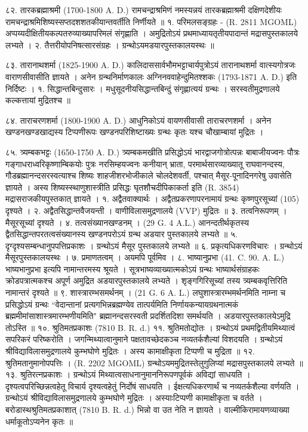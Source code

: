 ८२. तारकब्रह्माश्रमी (1700-1800 A. D.)
रामचन्द्राश्रमिणं नमस्यन्नयं तारकब्रह्माश्रमी दक्षिणदेशीयः रामचन्द्राश्रमिशिष्यस्सप्तदशशतकीयान्तवर्तीति निर्णीयते ॥
१. परिमलसङ्ग्रहः - (R. 2811 MGOML) अप्पय्यदीक्षितीयकल्पतरुव्याख्यापरिमलं संगृह्णाति । अमुद्रितोऽयं प्रथमाध्यायतृतीयपादान्तं मद्रासपुस्तकालये लभ्यते ।
२. तैत्तरीयोपनिषत्सारसंग्रहः । ग्रन्थोऽयमडयारपुस्तकालयस्थः ॥

८३. तारानाथशर्मा (1825-1900 A. D.)
कालिदाससार्वभौमभट्टाचार्यपुत्रोऽयं तारानाथशर्मा वात्स्यगोत्रजः वाराणसीवासीति ज्ञायते । अनेन ग्रन्थनिर्माणकालः अग्निनववाहेन्दुमितश्शकः (1793-1871 A. D.) इति निर्दिष्टः ।
१. सिद्धान्तबिन्दुसारः । मधुसूदनीयसिद्धान्तबिन्दुं संगृह्णात्ययं ग्रन्थः । सरस्वतीमुद्रणालये कल्कत्तायां मुद्रितश्च ॥

८४. ताराचरणशर्मा (1800-1900 A. D.)
आधुनिकोऽयं वायणसीवासी ताराचरणशर्मा । अनेन खण्डनखण्डखाद्यस्य टिप्पणीरूपः खण्डनपरिशिष्टाख्यः ग्रन्थः कृतः यश्च चौखाम्बायां मुद्रितः ।

८५. त्र्यम्बकभट्टः (1650-1750 A. D.)
त्र्यम्बकमखीति प्रसिद्धोऽयं भारद्वाजगोत्रोत्पन्नः बाबाजीयज्वनः पौत्रः गङ्गाधराध्वरिकृष्णाम्बिकयोः पुत्रः नरसिम्हयज्वनः कनीयान् भ्राता, परमार्थसारव्याख्यातू राघवानन्दस्य, गौडब्रह्मानन्दसरस्वत्याश्च शिष्यः शाहजीशरभोजीकाले चोलदेशवर्ती, पश्चात् मैसूर-पूनादिनगरेषु उवासेति ज्ञायते । अस्य शिष्यस्स्थाणुशास्त्रीति प्रसिद्धः घृतशौचदीपिकाकर्ता इति (R. 3854) मद्रासराजकीयपुस्तकात् ज्ञायते ।
१. अद्वैतवाक्यार्थः । अद्वैतप्रकरणापरनामायं ग्रन्थः कृष्णपुरसूच्यां (105) दृश्यते ।
२. अद्वैतसिद्धान्तवैजयन्ती । वाणीविलासमुद्रणालये (VVP) मुद्रितः ॥
३. तत्वनिरूपणम् । मैसूरसूच्यां दृश्यते ।
४. तत्वसंख्यानखण्डनम् । (29 G. 4 A.L.)
आनन्दतीर्थकृतस्य द्वैतसिद्धान्तपरतत्वसंख्यानस्य खण्डनपरोऽयं ग्रन्थ अडयार पुस्तकालये लभ्यते ॥
५. दृग्दृश्यसम्बन्धानुपपत्तिप्रकाशः । ग्रन्थोऽयं मैसूर पुस्तकालये लभ्यते ॥
६. प्रकृत्यधिकरणविचारः । ग्रन्थोऽयं मैसूरपुस्तकालयस्थः ।
७. प्रमाणतत्वम् । अयमपि पूर्वमिव ।
८. भाष्यानुप्रभा (41. C. 90. A. L.)
भाष्यभानुप्रभा इत्यपि नामान्तरमस्य श्रूयते । सूत्रभाष्यव्याख्यात्मकोऽयं ग्रन्थः भाष्यार्थसंग्राहकः क्रोडपत्रात्मकश्च अपूर्ण अमुद्रित अडयारपुस्तकालये लभ्यते । शृङ्गगिरिसूच्यां तस्य त्र्यम्बकवृत्तिरिति नामान्तरं दृश्यते ॥
९. शास्त्रारम्भसमर्थनम् । (21 G. 6 A. L.)
लघुशास्त्रारम्भमर्थनमिति नाम्ना च प्रसिद्धोऽयं ग्रन्थः ``वेदान्तानां प्रत्यगभिन्नब्रह्मण्येव तात्पर्यमिति निर्णायकन्यायग्रथनात्मकं ब्रह्ममीमांसाशास्त्रमारम्भणीयमिति" ब्रह्मानन्दसरस्वती प्रदर्शितदिशा समर्थयति । अडयारपुस्तकालयेऽमुद्रि तोऽस्ति ॥
१०. श्रुतिमतप्रकाशः (7810 B. R. d.)
११. श्रुतिमतोद्योतः । ग्रन्थोऽयं प्रथमद्वितीयमिथ्यात्वं सपरिकरं परिष्करोति । जगन्मिथ्यात्वानुमाने पक्षतावच्छेदकञ्च नव्यतर्कशैल्यां विशदयति । ग्रन्थोऽयं श्रीविद्याविलासमुद्रणालये कुम्भघोणे मुद्रितः । अस्य कामाक्षीकृता टिप्पणी च मुद्रिता ॥
१२. श्रुतिमतानुमानोपपत्तिः । (R. 2202 MGOML) ग्रन्थोऽयममुद्रितस्तेलुगुलिप्यां मद्रासपुस्तकालये लभ्यते ॥
१३. श्रुतिरत्नप्रकाशः । ग्रन्थोऽयं मिथ्यात्वसाधनानुमाननिरूपणपूर्वकं अविद्यां साधयति । दृश्यत्वपरिच्छिन्नत्वहेतू विचार्य दृश्यत्वहेतुं निर्दोषं साधयति । ईक्षत्यधिकरणार्थं च नव्यतर्कशैल्या वर्णयति । ग्रन्थोऽयं श्रीविद्याविलासमुद्रणालये कुम्भघोणे मुद्रितः । अस्याःटिप्पणी कामाक्षीकृता च वर्तते । बरोडास्थश्रुतिमतप्रकाशात् (7810 B. R. d.) भिन्नो वा उत नेति न ज्ञायते । वाल्मीकिरामायणव्याख्या धर्माकूतोऽप्यनेन कृतः ॥

